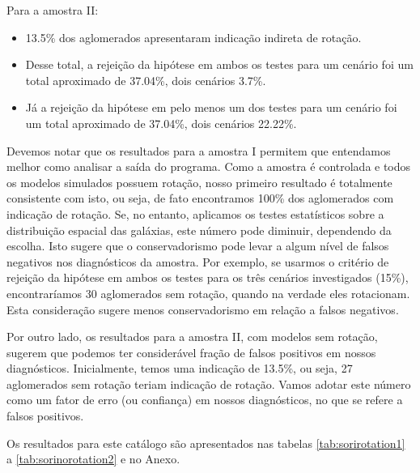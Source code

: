 Para a amostra II:
\begin{itemize}
   	\item 13.5\% dos aglomerados apresentaram indicação indireta de rotação.
   	\item Desse total, a rejeição da hipótese em ambos os testes para um cenário foi um total aproximado de 37.04\%, dois cenários 3.7\%.
   	\item Já a rejeição da hipótese em pelo menos um dos testes para um cenário foi um total aproximado de 37.04\%, dois cenários 22.22\%. 
 \end{itemize} 

Devemos notar que os resultados para a amostra I permitem que entendamos melhor como analisar a saída do programa.
Como a amostra é controlada e todos os modelos simulados possuem rotação, nosso primeiro resultado é totalmente
consistente com isto, ou seja, de fato encontramos 100\% dos aglomerados com indicação de rotação. Se, no entanto, 
aplicamos os testes estatísticos sobre a distribuição espacial das galáxias, este número pode diminuir, dependendo 
da escolha. Isto sugere que o conservadorismo pode levar a algum nível de falsos negativos nos diagnósticos da amostra.
Por exemplo, se usarmos o critério de  rejeição da hipótese em ambos os testes para os três cenários investigados (15\%),
encontraríamos 30 aglomerados sem rotação, quando na verdade eles rotacionam. Esta consideração sugere 
menos conservadorismo em relação a falsos negativos.

Por outro lado, os resultados para a amostra II, com modelos sem rotação, sugerem que podemos ter considerável
fração de falsos positivos em nossos diagnósticos. Inicialmente, temos uma indicação de 13.5\%, ou seja, 27 aglomerados
sem rotação teriam indicação de rotação. Vamos adotar este número como um fator de erro (ou confiança) em nossos diagnósticos,
no que se refere a falsos positivos.


Os resultados para este catálogo são apresentados nas tabelas \ref{tab:sorirotation1} a \ref{tab:sorinorotation2} e no Anexo.

